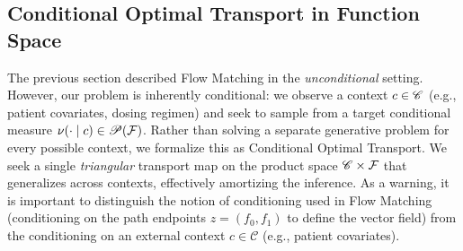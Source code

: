 
\subsection{Conditional Optimal Transport in Function Space}
\label{sec:conditional-ot}
The previous section described Flow Matching in the \textit{unconditional} setting. However, our problem is inherently conditional: we observe a context $c\in \mathscr{C}$ (e.g., patient covariates, dosing regimen) and seek to sample from a target conditional measure $\nu(\cdot\mid c)\in\mathscr{P}(\mathcal{F})$. 
%
Rather than solving a separate generative problem for every possible context, we formalize this as Conditional Optimal Transport. We seek a single \textit{triangular} transport map on the product space $\mathscr{C}\times\mathcal{F}$ that generalizes across contexts, effectively amortizing the inference. As a warning, it is important to distinguish the notion of conditioning used in Flow Matching (conditioning on the path endpoints $z=(f_0, f_1)$ to define the vector field) from the conditioning on an external context $c \in \mathscr{C}$ (e.g., patient covariates).

